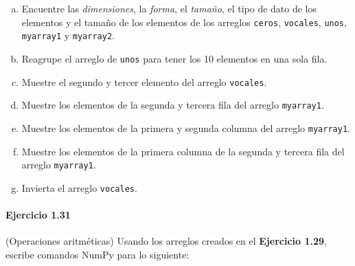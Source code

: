 \begin{enumerate}[(a)]
	\item

	      Encuentre las \emph{dimensiones}, la \emph{forma}, el
	      \emph{tamaño}, el tipo de dato de los elementos y el tamaño
	      de los elementos de los arreglos \texttt{ceros},
	      \texttt{vocales}, \texttt{unos},
	      \texttt{myarray1} y
	      \texttt{myarray2}.

	\item

	      Reagrupe el arreglo de \texttt{unos} para tener
	      los 10 elementos en una sola fila.

	\item

	      Muestre el segundo y tercer elemento del arreglo
	      \texttt{vocales}.

	\item

	      Muestre los elementos de la segunda y tercera fila del
	      arreglo \texttt{myarray1}.

	\item

	      Muestre los elementos de la primera y segunda columna del
	      arreglo \texttt{myarray1}.

	\item

	      Muestre los elementos de la primera columna de la segunda y
	      tercera fila del arreglo \texttt{myarray1}.

	\item

	      Invierta el arreglo \texttt{vocales}.
\end{enumerate}

\paragraph{\color{DarkBlue}Ejercicio 1.31}
(Operaciones aritméticas)
Usando los arreglos creados en el
\textbf{\color{DarkBlue}Ejercicio 1.29}, escribe comandos NumPy para
lo siguiente:

